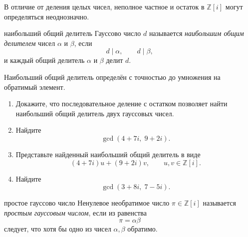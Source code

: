 \begin{remarkbox}
В отличие от деления целых чисел, неполное частное и остаток
в $\mathbb Z[i]$ могут определяться неоднозначно.
\end{remarkbox}

\begin{defbox}{наибольший общий делитель}
Гауссово число $d$ называется \emph{наибольшим общим делителем}
чисел $\alpha$ и $\beta$, если
\[
    d\mid\alpha,\qquad d\mid\beta,
\]
и каждый общий делитель $\alpha$ и $\beta$ делит $d$.

Наибольший общий делитель определён с точностью до умножения на
обратимый элемент.
\end{defbox}


\begin{enumerate}[label=\textbf{\alph*)}, leftmargin=8mm]
    \item Докажите, что последовательное деление с остатком позволяет
    найти наибольший общий делитель двух гауссовых чисел.

    \item Найдите
    \[
        \gcd(4+7i,\;9+2i).
    \]

    \item Представьте найденный наибольший общий делитель в виде
    \[
        (4+7i)u+(9+2i)v,
        \qquad u,v\in\mathbb Z[i].
    \]

    \item Найдите
    \[
        \gcd(3+8i,\;7-5i).
    \]
\end{enumerate}

\medskip

\begin{defbox}{простое гауссово число}
Ненулевое необратимое число $\pi\in\mathbb Z[i]$ называется
\emph{простым гауссовым числом}, если из равенства
\[
    \pi=\alpha\beta
\]
следует, что хотя бы одно из чисел $\alpha,\beta$ обратимо.
\end{defbox}


